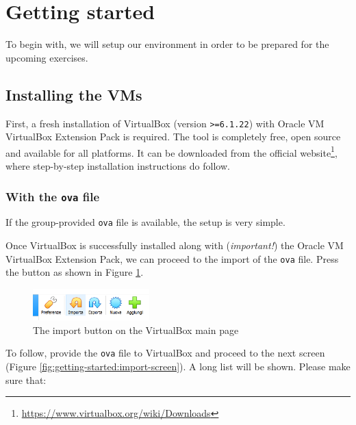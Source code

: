 \section{Getting started}
\label{sec:getting-started}

To begin with, we will setup our environment in order to be prepared for the upcoming exercises.

\subsection{Installing the VMs}

First, a fresh installation of VirtualBox (version \texttt{>=6.1.22}) with Oracle VM VirtualBox Extension Pack is required. The tool is completely free, open source and available for all platforms. It can be downloaded from the official website\footnote{\url{https://www.virtualbox.org/wiki/Downloads}}, where step-by-step installation instructions do follow.

\subsubsection{With the \texttt{ova} file}
\label{subsubsec:getting-started:with-ova}

If the group-provided \texttt{ova} file is available, the setup is very simple. 

Once VirtualBox is successfully installed along with (\textit{important!}) the Oracle VM VirtualBox Extension Pack, we can proceed to the import of the \texttt{ova} file. Press the button as shown in Figure \ref{fig:getting-started:import-button}.

\begin{figure}[htbp]
	\centering
	\includegraphics[width=0.4\textwidth]{../drawable/decorations/importing-button.png}
    \caption{The import button on the VirtualBox main page}
    \label{fig:getting-started:import-button}
\end{figure}

To follow, provide the \texttt{ova} file to VirtualBox and proceed to the next screen (Figure \ref{fig:getting-started:import-screen}). A long list will be shown. Please make sure that:

